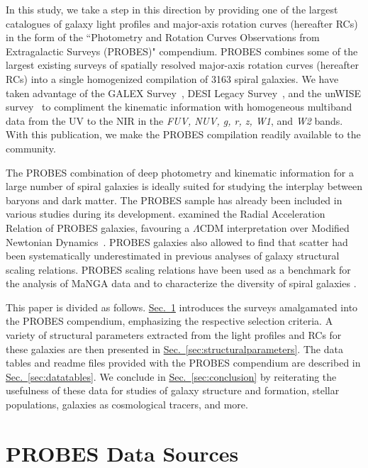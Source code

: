 \documentclass[twocolumn]{aastex631}
\newcommand{\Sec}[1]{{\protect\hyperref[sec:#1]{Sec.~\ref*{sec:#1}}}}
\newcommand{\probesnedunique}{3163\xspace}
\begin{document}
In this study, we take a step in this direction by providing one of the largest catalogues of galaxy light profiles and major-axis rotation curves (hereafter RCs) in the form of the ``Photometry and Rotation Curves Observations from Extragalactic Surveys (PROBES)" compendium.
PROBES combines some of the largest existing surveys of spatially resolved major-axis rotation curves (hereafter RCs) into a single homogenized compilation of \probesnedunique spiral galaxies. 
We have taken advantage of the GALEX Survey~\citep{Bianchi2017}, DESI Legacy Survey~\citep{Dey2019}, and the unWISE survey~\citep{Lang2014} to compliment the kinematic information with homogeneous multiband data from the UV to the NIR in the {\it FUV, NUV, g, r, z, W1}, and {\it W2} bands. 
With this publication, we make the PROBES compilation readily available to the community.

The PROBES combination of deep photometry and kinematic information for a large number of spiral galaxies is ideally suited for studying the interplay between baryons and dark matter.
The PROBES sample has already been included in various studies during its development.
\citet{Stone2019} examined the Radial Acceleration Relation of PROBES galaxies, favouring a $\Lambda$CDM interpretation over Modified Newtonian Dynamics~\citep{Lelli2017}.  
PROBES galaxies also allowed \citet{Stone2021a} to find that scatter had been systematically underestimated in previous analyses of galaxy structural scaling relations.
PROBES scaling relations have been used as a benchmark for the analysis of MaNGA data \citet{Arora2021} and to characterize the diversity of spiral galaxies \citet{Frosst2022}.

This paper is divided as follows.
\Sec{probessources} introduces the surveys amalgamated into the PROBES compendium, emphasizing the respective selection criteria.
A variety of structural parameters extracted from the light profiles and RCs for these galaxies are then presented in \Sec{structuralparameters}. 
The data tables and readme files provided with the PROBES compendium are described in \Sec{datatables}.
We conclude in \Sec{conclusion} by reiterating the usefulness of these data for studies of galaxy structure and formation, stellar populations, galaxies as cosmological tracers, and more. 

\section{PROBES Data Sources}\label{sec:probessources}
\end{document}
